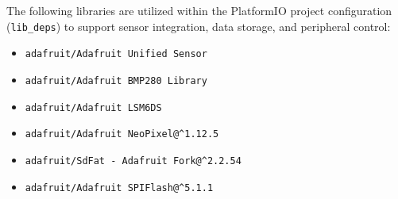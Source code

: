 \documentclass[12pt]{report}
\begin{document}
The following libraries are utilized within the PlatformIO project configuration (\texttt{lib\_deps}) to support sensor integration, data storage, and peripheral control:

\begin{itemize}
    \item \texttt{adafruit/Adafruit Unified Sensor}
    \item \texttt{adafruit/Adafruit BMP280 Library}
    \item \texttt{adafruit/Adafruit LSM6DS}
    \item \texttt{adafruit/Adafruit NeoPixel@\^{}1.12.5}
    \item \texttt{adafruit/SdFat - Adafruit Fork@\^{}2.2.54}
    \item \texttt{adafruit/Adafruit SPIFlash@\^{}5.1.1}
\end{itemize}
\end{document}
